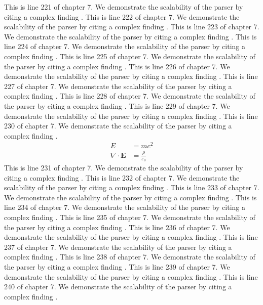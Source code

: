 This is line 221 of chapter 7. We demonstrate the scalability of the parser by citing a complex finding \cite{ref7_221}.
This is line 222 of chapter 7. We demonstrate the scalability of the parser by citing a complex finding \cite{ref7_222}.
This is line 223 of chapter 7. We demonstrate the scalability of the parser by citing a complex finding \cite{ref7_223}.
This is line 224 of chapter 7. We demonstrate the scalability of the parser by citing a complex finding \cite{ref7_224}.
This is line 225 of chapter 7. We demonstrate the scalability of the parser by citing a complex finding \cite{ref7_225}.
This is line 226 of chapter 7. We demonstrate the scalability of the parser by citing a complex finding \cite{ref7_226}.
This is line 227 of chapter 7. We demonstrate the scalability of the parser by citing a complex finding \cite{ref7_227}.
This is line 228 of chapter 7. We demonstrate the scalability of the parser by citing a complex finding \cite{ref7_228}.
This is line 229 of chapter 7. We demonstrate the scalability of the parser by citing a complex finding \cite{ref7_229}.
This is line 230 of chapter 7. We demonstrate the scalability of the parser by citing a complex finding \cite{ref7_230}.
\begin{align*}
  E &= mc^2 \\
  \nabla \cdot \mathbf{E} &= \frac{\rho}{\varepsilon_0}
\end{align*}
This is line 231 of chapter 7. We demonstrate the scalability of the parser by citing a complex finding \cite{ref7_231}.
This is line 232 of chapter 7. We demonstrate the scalability of the parser by citing a complex finding \cite{ref7_232}.
This is line 233 of chapter 7. We demonstrate the scalability of the parser by citing a complex finding \cite{ref7_233}.
This is line 234 of chapter 7. We demonstrate the scalability of the parser by citing a complex finding \cite{ref7_234}.
This is line 235 of chapter 7. We demonstrate the scalability of the parser by citing a complex finding \cite{ref7_235}.
This is line 236 of chapter 7. We demonstrate the scalability of the parser by citing a complex finding \cite{ref7_236}.
This is line 237 of chapter 7. We demonstrate the scalability of the parser by citing a complex finding \cite{ref7_237}.
This is line 238 of chapter 7. We demonstrate the scalability of the parser by citing a complex finding \cite{ref7_238}.
This is line 239 of chapter 7. We demonstrate the scalability of the parser by citing a complex finding \cite{ref7_239}.
This is line 240 of chapter 7. We demonstrate the scalability of the parser by citing a complex finding \cite{ref7_240}.
